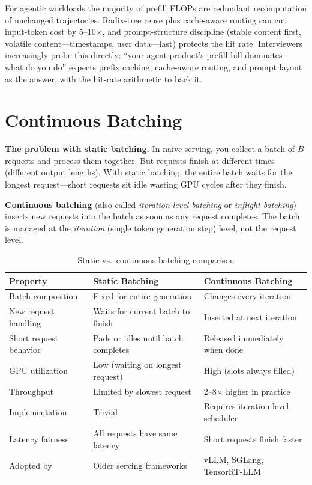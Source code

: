 \begin{keyinsight}
For agentic workloads the majority of prefill FLOPs are redundant recomputation of unchanged trajectories. Radix-tree reuse plus cache-aware routing can cut input-token cost by 5--10$\times$, and prompt-structure discipline (stable content first, volatile content---timestamps, user data---last) protects the hit rate. Interviewers increasingly probe this directly: ``your agent product's prefill bill dominates---what do you do'' expects prefix caching, cache-aware routing, and prompt layout as the answer, with the hit-rate arithmetic to back it.
\end{keyinsight}

\section{Continuous Batching}
\label{sec:continuous_batching}

\textbf{The problem with static batching.} In naive serving, you collect a batch of $B$ requests and process them together. But requests finish at different times (different output lengths). With static batching, the entire batch waits for the longest request---short requests sit idle wasting GPU cycles after they finish.

\textbf{Continuous batching} (also called \textit{iteration-level batching} or \textit{inflight batching}) inserts new requests into the batch as soon as any request completes. The batch is managed at the \textit{iteration} (single token generation step) level, not the request level.

\begin{table}[H]
\centering
\caption{Static vs.\ continuous batching comparison}
\begin{tabularx}{\textwidth}{lXX}
\toprule
\textbf{Property} & \textbf{Static Batching} & \textbf{Continuous Batching} \\
\midrule
Batch composition & Fixed for entire generation & Changes every iteration \\
New request handling & Waits for current batch to finish & Inserted at next iteration \\
Short request behavior & Pads or idles until batch completes & Released immediately when done \\
GPU utilization & Low (waiting on longest request) & High (slots always filled) \\
Throughput & Limited by slowest request & 2--8$\times$ higher in practice \\
Implementation & Trivial & Requires iteration-level scheduler \\
Latency fairness & All requests have same latency & Short requests finish faster \\
Adopted by & Older serving frameworks & vLLM, SGLang, TensorRT-LLM \\
\bottomrule
\end{tabularx}
\end{table}

